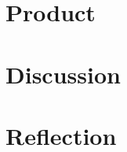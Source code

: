 \documentclass[titlepage]{article}
\begin{document}
\section*{Product}
\section*{Discussion}
\section*{Reflection}



\end{document}

